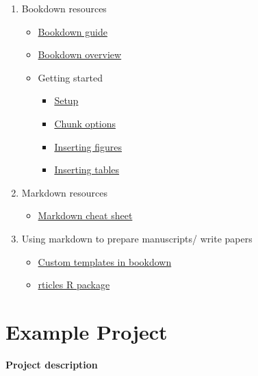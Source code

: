 \documentclass[
]{article}
\providecommand{\tightlist}{%
  \setlength{\itemsep}{0pt}\setlength{\parskip}{0pt}}
\begin{document}
\begin{enumerate}
\def\labelenumi{\arabic{enumi}.}
\item
  Bookdown resources

  \begin{itemize}
  \tightlist
  \item
    \href{https://bookdown.org/yihui/bookdown/}{Bookdown guide}
  \item
    \href{https://bookdown.org/}{Bookdown overview}
  \item
    Getting started

    \begin{itemize}
    \item
      \href{https://bookdown.org/yihui/bookdown/get-started.html}{Setup}
    \item
      \href{https://yihui.org/knitr/options/}{Chunk options}
    \item
      \href{https://bookdown.org/yihui/bookdown/figures.html}{Inserting
      figures}
    \item
      \href{https://bookdown.org/yihui/bookdown/tables.html}{Inserting
      tables}
    \end{itemize}
  \end{itemize}
\item
  Markdown resources

  \begin{itemize}
  \tightlist
  \item
    \href{https://www.markdownguide.org/cheat-sheet/}{Markdown cheat
    sheet}
  \end{itemize}
\item
  Using markdown to prepare manuscripts/ write papers

  \begin{itemize}
  \item
    \href{https://bookdown.org/yihui/rmarkdown-cookbook/latex-template.html}{Custom
    templates in bookdown}
  \item
    \href{https://github.com/rstudio/rticles}{rticles R package}
  \end{itemize}
\end{enumerate}

\hypertarget{example-project}{%
\section{Example Project}\label{example-project}}

\textbf{Project description}
\end{document}
